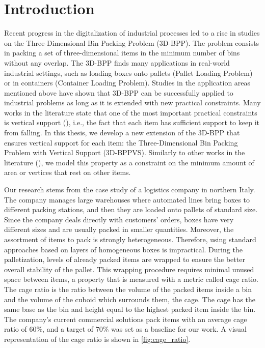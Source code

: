 \documentclass[11pt,a4paper,twocolumn]{article}
\begin{document}
\section{Introduction}
\label{sec:introduction}

Recent progress in the digitalization of industrial processes led to a rise in studies on the Three-Dimensional Bin Packing Problem (3D-BPP).
The problem consists in packing a set of three-dimensional items in the minimum number of bins without any overlap.
The 3D-BPP finds many applications in real-world industrial settings, such as loading boxes onto pallets (Pallet Loading Problem) or in containers (Container Loading Problem). 
Studies in the application areas mentioned above have shown that 3D-BPP can be successfully applied to industrial problems as long as it is extended with new practical constraints. 
Many works in the literature state that one of the most important practical constraints is vertical support (\cite{BORTFELDT20131}), i.e., the fact that each item has sufficient support to keep it from falling.
In this thesis, we develop a new extension of the 3D-BPP that ensures vertical support for each item: the Three-Dimensional Bin Packing Problem with Vertical Support (3D-BPPVS).
Similarly to other works in the literature (\cite{GZARA20201062,paquay2016mixed}), we model this property as a constraint on the minimum amount of area or vertices that rest on other items.

Our research stems from the case study of a logistics company in northern Italy.
The company manages large warehouses where automated lines bring boxes to different packing stations, and then they are loaded onto pallets of standard size.
Since the company deals directly with customers' orders, boxes have very different sizes and are usually packed in smaller quantities.
Moreover, the assortment of items to pack is strongly heterogeneous. Therefore, using standard approaches based on layers of homogeneous boxes is impractical.
During the palletization, levels of already packed items are wrapped to ensure the better overall stability of the pallet.
This wrapping procedure requires minimal unused space between items, a property that is measured with a metric called cage ratio.
The cage ratio is the ratio between the volume of the packed items inside a bin and the volume of the cuboid which surrounds them, the cage.
The cage has the same base as the bin and height equal to the highest packed item inside the bin.
The company's current commercial solutions pack items with an average cage ratio of $60\%$, and a target of $70\%$ was set as a baseline for our work.
A visual representation of the cage ratio is shown in \cref{fig:cage_ratio}.
\end{document}

